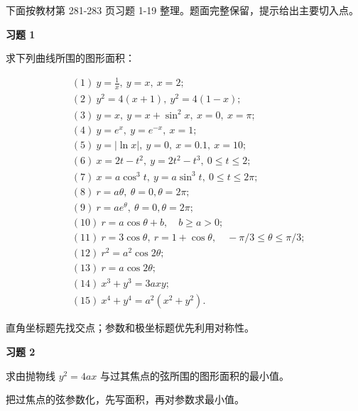 下面按教材第 281-283 页习题 1-19 整理。题面完整保留，提示给出主要切入点。

\begin{exercisebox}
\textbf{习题 1 }

求下列曲线所围的图形面积：

\[
      \begin{aligned}
      &(1)\ y=\frac1x,\ y=x,\ x=2;\\
      &(2)\ y^2=4(x+1),\ y^2=4(1-x);\\
      &(3)\ y=x,\ y=x+\sin^2x,\ x=0,\ x=\pi;\\
      &(4)\ y=e^x,\ y=e^{-x},\ x=1;\\
      &(5)\ y=|\ln x|,\ y=0,\ x=0.1,\ x=10;\\
      &(6)\ x=2t-t^2,\ y=2t^2-t^3,\ 0\le t\le2;\\
      &(7)\ x=a\cos^3t,\ y=a\sin^3t,\ 0\le t\le2\pi;\\
      &(8)\ r=a\theta,\ \theta=0,\theta=2\pi;\\
      &(9)\ r=ae^\theta,\ \theta=0,\theta=2\pi;\\
      &(10)\ r=a\cos\theta+b,\quad b\ge a>0;\\
      &(11)\ r=3\cos\theta,\ r=1+\cos\theta,\quad -\pi/3\le\theta\le\pi/3;\\
      &(12)\ r^2=a^2\cos2\theta;\\
      &(13)\ r=a\cos2\theta;\\
      &(14)\ x^3+y^3=3axy;\\
      &(15)\ x^4+y^4=a^2(x^2+y^2).
      \end{aligned}
      \]

\begin{hintbox}
直角坐标题先找交点；参数和极坐标题优先利用对称性。
\end{hintbox}
\end{exercisebox}

\begin{exercisebox}
\textbf{习题 2 }

求由抛物线 \(y^2=4ax\) 与过其焦点的弦所围的图形面积的最小值。

\begin{hintbox}
把过焦点的弦参数化，先写面积，再对参数求最小值。
\end{hintbox}
\end{exercisebox}

